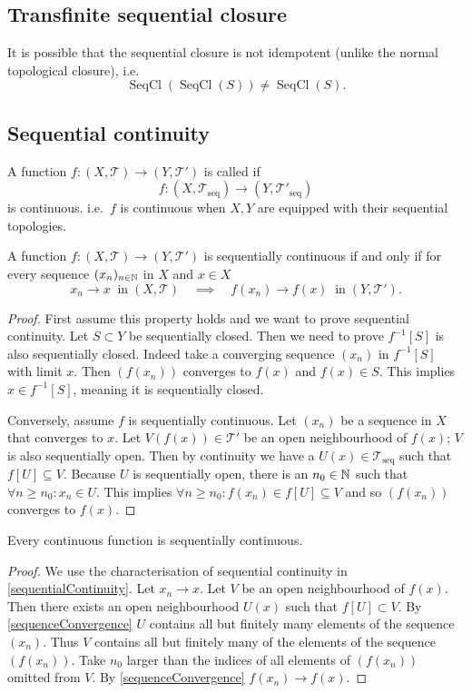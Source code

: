 \subsection{Transfinite sequential closure}
It is possible that the sequential closure is not idempotent (unlike the normal topological closure), i.e.\
\[ \operatorname{SeqCl}(\operatorname{SeqCl}(S)) \neq \operatorname{SeqCl}(S). \]

\subsection{Sequential continuity}
\begin{definition}
A function $f:(X,\mathcal{T})\to(Y,\mathcal{T}')$ is called  if
\[ f:(X,\mathcal{T}_\text{seq})\to(Y,\mathcal{T}'_\text{seq}) \]
is continuous. i.e.\ $f$ is continuous when $X,Y$ are equipped with their sequential topologies.
\end{definition}

\begin{proposition} \label{sequentialContinuity}
A function $f:(X,\mathcal{T})\to(Y,\mathcal{T}')$ is sequentially continuous \textup{if and only if} for every sequence $(x_n)_{n\in\mathbb{N}}$ in $X$ and $x\in X$
\[ x_n \to x \;\;\text{in}\; (X,\mathcal{T}) \quad\implies\quad f(x_n)\to f(x) \;\;\text{in}\; (Y,\mathcal{T}'). \]
\end{proposition}
\begin{proof}
First assume this property holds and we want to prove sequential continuity. Let $S\subset Y$ be sequentially closed. Then we need to prove $f^{-1}[S]$ is also sequentially closed. Indeed take a converging sequence $(x_n)$ in $f^{-1}[S]$ with limit $x$. Then $(f(x_n))$ converges to $f(x)$ and $f(x)\in S$. This implies $x\in f^{-1}[S]$, meaning it is sequentially closed. 

Conversely, assume $f$ is sequentially continuous. Let $(x_n)$ be a sequence in $X$ that converges to $x$. Let $V(f(x))\in \mathcal{T}'$ be an open neighbourhood of $f(x)$; $V$ is also sequentially open. Then by continuity we have a $U(x)\in\mathcal{T}_\text{seq}$ such that $f[U]\subseteq V$. Because $U$ is sequentially open, there is an $n_0\in\mathbb{N}$ such that $\forall n\geq n_0: x_n\in U$.
This implies $\forall n\geq n_0: f(x_n)\in f[U]\subseteq V$ and so $(f(x_n))$ converges to $f(x)$.
\end{proof}
\begin{proposition}
Every continuous function is sequentially continuous.
\end{proposition}
\begin{proof}
We use the characterisation of sequential continuity in \ref{sequentialContinuity}. Let $x_n\to x$. Let $V$ be an open neighbourhood of $f(x)$. Then there exists an open neighbourhood $U(x)$ such that $f[U]\subset V$. By \ref{sequenceConvergence} $U$ contains all but finitely many elements of the sequence $(x_n)$. Thus $V$ contains all but finitely many of the elements of the sequence $(f(x_n))$. Take $n_0$ larger than the indices of all elements of $(f(x_n))$ omitted from $V$. By \ref{sequenceConvergence} $f(x_n)\to f(x)$.
\end{proof}

